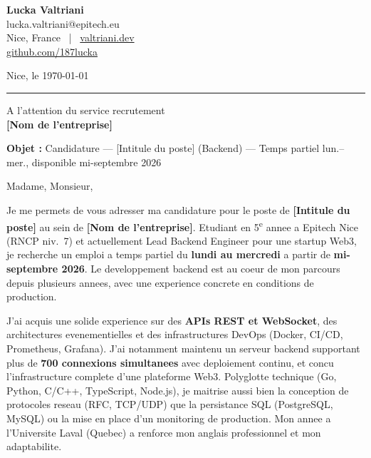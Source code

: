 \documentclass[11pt,a4paper]{article}
\newcommand{\myphone}{}
\newcommand{\entreprise}{[Nom de l'entreprise]}
\newcommand{\poste}{[Intitule du poste]}
\begin{document}
\begin{minipage}[t]{0.55\linewidth}
  {\large\bfseries\color{accent} Lucka Valtriani}\\[2pt]
  {\small\color{gray}
    \myphone{}lucka.valtriani@epitech.eu\\
    Nice, France ~|~ \href{https://valtriani.dev}{valtriani.dev}\\
    \href{https://github.com/187lucka}{github.com/187lucka}
  }
\end{minipage}
\hfill
\begin{minipage}[t]{0.38\linewidth}
  \raggedleft
  {\small\color{gray} Nice, le \today}
\end{minipage}

\vspace{0.5pt}
{\color{accent}\rule{\linewidth}{0.6pt}}
\vspace{14pt}

{\small\color{gray}
  A l'attention du service recrutement\\
  \textbf{\entreprise}
}

\vspace{14pt}

\noindent\textbf{Objet :} Candidature --- \poste{} (Backend) --- Temps partiel lun.--mer., disponible mi-septembre 2026

\vspace{18pt}

Madame, Monsieur,

\vspace{4pt}

Je me permets de vous adresser ma candidature pour le poste de \textbf{\poste} au sein de \textbf{\entreprise}. Etudiant en 5\textsuperscript{e} annee a Epitech Nice (RNCP niv.~7) et actuellement Lead Backend Engineer pour une startup Web3, je recherche un emploi a temps partiel du \textbf{lundi au mercredi} a partir de \textbf{mi-septembre 2026}. Le developpement backend est au coeur de mon parcours depuis plusieurs annees, avec une experience concrete en conditions de production.

J'ai acquis une solide experience sur des \textbf{APIs REST et WebSocket}, des architectures evenementielles et des infrastructures DevOps (Docker, CI/CD, Prometheus, Grafana). J'ai notamment maintenu un serveur backend supportant plus de \textbf{700 connexions simultanees} avec deploiement continu, et concu l'infrastructure complete d'une plateforme Web3. Polyglotte technique (Go, Python, C/C++, TypeScript, Node.js), je maitrise aussi bien la conception de protocoles reseau (RFC, TCP/UDP) que la persistance SQL (PostgreSQL, MySQL) ou la mise en place d'un monitoring de production. Mon annee a l'Universite Laval (Quebec) a renforce mon anglais professionnel et mon adaptabilite.
\end{document}
